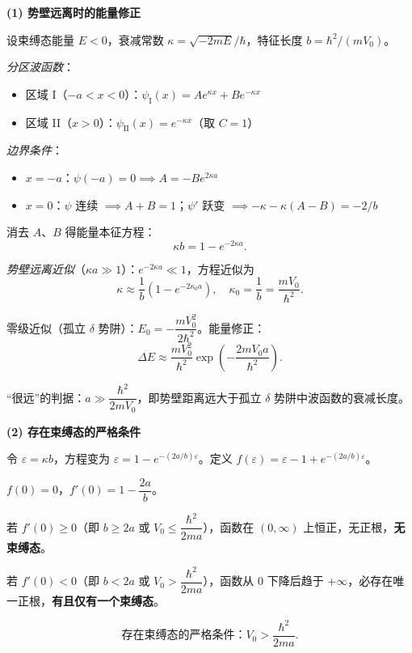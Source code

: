 \begin{derivationbox}[标准解题过程]
\textbf{(1) 势壁远离时的能量修正}

设束缚态能量 $E<0$，衰减常数 $\kappa=\sqrt{-2mE}/\hbar$，特征长度 $b=\hbar^2/(mV_0)$。

\textit{分区波函数}：
\begin{itemize}
    \item 区域 I（$-a<x<0$）：$\psi_{\text{I}}(x)=Ae^{\kappa x}+Be^{-\kappa x}$
    \item 区域 II（$x>0$）：$\psi_{\text{II}}(x)=e^{-\kappa x}$（取 $C=1$）
\end{itemize}

\textit{边界条件}：
\begin{itemize}
    \item $x=-a$：$\psi(-a)=0\implies A=-Be^{2\kappa a}$
    \item $x=0$：$\psi$ 连续 $\implies A+B=1$；$\psi'$ 跃变 $\implies-\kappa-\kappa(A-B)=-2/b$
\end{itemize}

消去 $A$、$B$ 得能量本征方程：
\[
\kappa b=1-e^{-2\kappa a}.
\]

\textit{势壁远离近似}（$\kappa a\gg1$）：$e^{-2\kappa a}\ll1$，方程近似为
\[
\kappa\approx\frac{1}{b}\left(1-e^{-2\kappa_0 a}\right),\quad\kappa_0=\frac{1}{b}=\frac{mV_0}{\hbar^2}.
\]

零级近似（孤立 $\delta$ 势阱）：$E_0=-\dfrac{mV_0^2}{2\hbar^2}$。能量修正：
\begin{equation}
\boxed{\Delta E\approx\frac{mV_0^2}{\hbar^2}\exp\left(-\frac{2mV_0 a}{\hbar^2}\right).}
\end{equation}

``很远''的判据：$a\gg\dfrac{\hbar^2}{2mV_0}$，即势壁距离远大于孤立 $\delta$ 势阱中波函数的衰减长度。

\textbf{(2) 存在束缚态的严格条件}

令 $\varepsilon=\kappa b$，方程变为 $\varepsilon=1-e^{-(2a/b)\varepsilon}$。定义 $f(\varepsilon)=\varepsilon-1+e^{-(2a/b)\varepsilon}$。

$f(0)=0$，$f'(0)=1-\dfrac{2a}{b}$。

若 $f'(0)\geq0$（即 $b\geq2a$ 或 $V_0\leq\dfrac{\hbar^2}{2ma}$），函数在 $(0,\infty)$ 上恒正，无正根，\textbf{无束缚态}。

若 $f'(0)<0$（即 $b<2a$ 或 $V_0>\dfrac{\hbar^2}{2ma}$），函数从 0 下降后趋于 $+\infty$，必存在唯一正根，\textbf{有且仅有一个束缚态}。

\begin{equation}
\boxed{\text{存在束缚态的严格条件：}V_0>\frac{\hbar^2}{2ma}.}
\end{equation}
\end{derivationbox}


